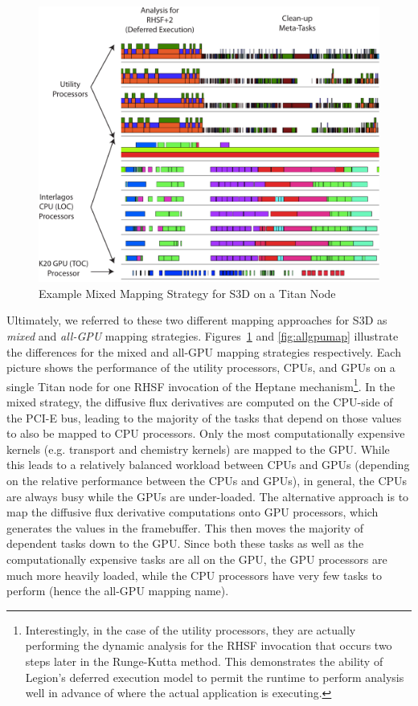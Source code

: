 \begin{figure}
\centering
\includegraphics[scale=0.8]{figs/MixedMapping.pdf}
\caption{Example Mixed Mapping Strategy for S3D on a Titan Node\label{fig:mixedmap}}
\end{figure}

Ultimately, we referred to these two different
mapping approaches for S3D as {\em mixed} and
{\em all-GPU} mapping strategies. Figures~\ref{fig:mixedmap}
and \ref{fig:allgpumap} illustrate the differences
for the mixed and all-GPU mapping strategies
respectively. Each picture shows the performance of
the utility processors, CPUs, and GPUs on a single
Titan node for one RHSF invocation of the Heptane
mechanism\footnote{Interestingly, in the case of 
the utility processors, they are actually performing 
the dynamic analysis for the RHSF invocation that
occurs two steps later in the Runge-Kutta method.
This demonstrates the ability of Legion's deferred
execution model to permit the runtime to perform
analysis well in advance of where the actual
application is executing.}. In the mixed
strategy, the diffusive flux derivatives are computed
on the CPU-side of the PCI-E bus, leading to the
majority of the tasks that depend on those values
to also be mapped to CPU processors. Only the most
computationally expensive kernels (e.g. transport
and chemistry kernels) are mapped to the GPU. While
this leads to a relatively balanced workload between
CPUs and GPUs (depending on the relative performance
between the CPUs and GPUs), in general, the CPUs
are always busy while the GPUs are under-loaded.
The alternative approach is to map the diffusive
flux derivative computations onto GPU processors,
which generates the values in the framebuffer. This
then moves the majority of dependent tasks down 
to the GPU. Since both these tasks as well as the
computationally expensive tasks are all on the
GPU, the GPU processors are much more heavily
loaded, while the CPU processors have very few
tasks to perform (hence the all-GPU mapping name).

